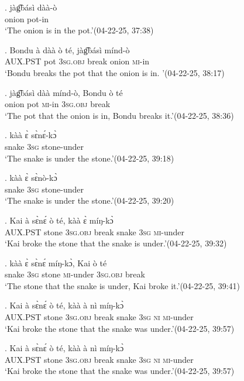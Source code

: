 \documentclass{assets/fieldnotes}
\begin{document}

\exg. jàg͡básì dàà-ò\\
onion pot-in\\
`The onion is in the pot.’\hfill{(04-22-25, 37:38)}

\exg. Bondu à dàà ò té, jàg͡básì mínd-ò\\
{} \textsc{AUX.PST} pot \textsc{3sg.obj} break onion \textsc{mi}-in\\
`Bondu breaks the pot that the onion is in. ’\hfill{(04-22-25, 38:17)}

\exg. jàg͡básì dàà mínd-ò, Bondu ò té\\
onion pot \textsc{mi}-in {} \textsc{3sg.obj} break\\
`The pot that the onion is in, Bondu breaks it.’\hfill{(04-22-25, 38:36)}

\exg. kàà ɛ̀ sɛ̀nɛ́-kɔ̀\\
snake \textsc{3sg} stone-under\\
`The snake is under the stone.’\hfill{(04-22-25, 39:18)}

\exg. kàà ɛ̀ sɛ̀nò-kɔ̀\\
snake \textsc{3sg} stone-under\\
`The snake is under the stone.’\hfill{(04-22-25, 39:20)}\\

\exg. Kai à sɛ̀nɛ́ ò té, kàà ɛ̀ míŋ-kɔ̀\\
{} \textsc{AUX.PST} stone \textsc{3sg.obj} break snake \textsc{3sg} \textsc{mi}-under\\
`Kai broke the stone that the snake is under.’\hfill{(04-22-25, 39:32)}

\exg. kàà ɛ̀ sɛ̀nɛ́ míŋ-kɔ̀, Kai ò té\\
snake \textsc{3sg} stone \textsc{mi}-under {} \textsc{3sg.obj} break \\
`The stone that the snake is under, Kai broke it.’\hfill{(04-22-25, 39:41)}

\exg. Kai à sɛ̀nɛ́ ò té, kàà à nì míŋ-kɔ̀\\
{} \textsc{AUX.PST} stone \textsc{3sg.obj} break snake \textsc{3sg} \textsc{ni} \textsc{mi}-under\\
`Kai broke the stone that the snake was under.’\hfill{(04-22-25, 39:57)}

\exg. Kai à sɛ̀nɛ́ ò té, kàà à nì míŋ-kɔ̀\\
{} \textsc{AUX.PST} stone \textsc{3sg.obj} break snake \textsc{3sg} \textsc{ni} \textsc{mi}-under\\
`Kai broke the stone that the snake was under.’\hfill{(04-22-25, 39:57)}
\end{document}
